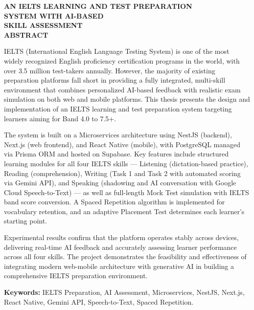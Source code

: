 \documentclass[a4paper,12pt]{extreport}
\begin{document}
\newpage
{} 
\setcounter{page}{1}
\thispagestyle{plain} 

\begin{center}
    \textbf{\fontsize{16pt}{19pt}\selectfont AN IELTS LEARNING AND TEST PREPARATION}\\
    \textbf{\fontsize{16pt}{19pt}\selectfont SYSTEM WITH AI-BASED}\\
    \textbf{\fontsize{16pt}{19pt}\selectfont SKILL ASSESSMENT}\\
    \vspace{1cm}
    \textbf{\fontsize{14pt}{16pt}\selectfont ABSTRACT}
\end{center}
\justify
\begin{sloppypar}
IELTS (International English Language Testing System) is one of the most widely recognized English proficiency certification programs in the world, with over 3.5 million test-takers annually. However, the majority of existing preparation platforms fall short in providing a fully integrated, multi-skill environment that combines personalized AI-based feedback with realistic exam simulation on both web and mobile platforms. This thesis presents the design and implementation of an IELTS learning and test preparation system targeting learners aiming for Band 4.0 to 7.5+.

The system is built on a Microservices architecture using NestJS (backend), Next.js (web frontend), and React Native (mobile), with PostgreSQL managed via Prisma ORM and hosted on Supabase. Key features include structured learning modules for all four IELTS skills — Listening (dictation-based practice), Reading (comprehension), Writing (Task 1 and Task 2 with automated scoring via Gemini API), and Speaking (shadowing and AI conversation with Google Cloud Speech-to-Text) — as well as full-length Mock Test simulation with IELTS band score conversion. A Spaced Repetition algorithm is implemented for vocabulary retention, and an adaptive Placement Test determines each learner's starting point.

Experimental results confirm that the platform operates stably across devices, delivering real-time AI feedback and accurately assessing learner performance across all four skills. The project demonstrates the feasibility and effectiveness of integrating modern web-mobile architecture with generative AI in building a comprehensive IELTS preparation environment.
\end{sloppypar}

\vspace{0.5cm}
{\sloppy \noindent \textbf{Keywords:} IELTS Preparation, AI Assessment, Microservices, NestJS, Next.js, React Native, Gemini API, Speech-to-Text, Spaced Repetition.\par}
\end{document}
